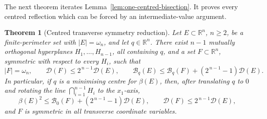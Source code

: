\documentclass[11pt]{amsart}
\newtheorem{theorem}{Theorem}[section]
\theoremstyle{definition}
\newcommand{\R}{\mathbb R}
\newcommand{\Def}{\mathcal D}
\begin{document}
The next theorem iterates Lemma~\ref{lem:one-centred-bisection}.
It proves every centred reflection which can be forced by an
intermediate-value argument.

\begin{theorem}[Centred transverse symmetry reduction]
\label{thm:transverse-oriented-reduction}
Let \(E\subset\R^n\), \(n\ge2\), be a finite-perimeter set with
\(|E|=\omega_n\), and let \(q\in\R^n\).
There exist \(n-1\) mutually orthogonal hyperplanes
\(H_1,\ldots,H_{n-1}\), all containing \(q\), and a set
\(F\subset\R^n\), symmetric with respect to every \(H_i\), such that
\[
   |F|=\omega_n,\qquad
   \Def(F)\le2^{\,n-1}\Def(E),\qquad
   \mathcal B_q(E)
      \le \mathcal B_q(F)+(2^{\,n-1}-1)\Def(E).
\tag{6.7g}\label{eq:transverse-reduction-output}
\]
In particular, if \(q\) is a minimising centre for \(\beta(E)\), then,
after translating \(q\) to \(0\) and rotating the line
\(\bigcap_{i=1}^{n-1}H_i\) to the \(x_1\)-axis,
\[
   \beta(E)^2
      \le\mathcal B_0(F)+(2^{\,n-1}-1)\Def(E),
   \qquad
   \Def(F)\le2^{\,n-1}\Def(E),
\tag{6.7h}\label{eq:transverse-reduction-beta}
\]
and \(F\) is symmetric in all transverse coordinate variables.
\end{theorem}
\end{document}
